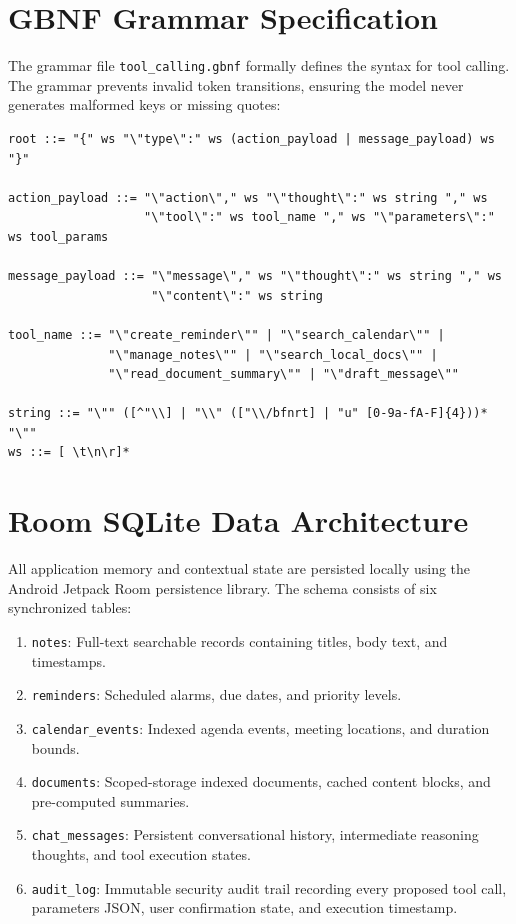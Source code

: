 \documentclass[12pt,a4paper,oneside]{report}
\begin{document}
\section{GBNF Grammar Specification}
The grammar file \texttt{tool\_calling.gbnf} formally defines the syntax for tool calling. The grammar prevents invalid token transitions, ensuring the model never generates malformed keys or missing quotes:
\begin{lstlisting}
root ::= "{" ws "\"type\":" ws (action_payload | message_payload) ws "}"

action_payload ::= "\"action\"," ws "\"thought\":" ws string "," ws 
                   "\"tool\":" ws tool_name "," ws "\"parameters\":" ws tool_params

message_payload ::= "\"message\"," ws "\"thought\":" ws string "," ws 
                    "\"content\":" ws string

tool_name ::= "\"create_reminder\"" | "\"search_calendar\"" | 
              "\"manage_notes\"" | "\"search_local_docs\"" | 
              "\"read_document_summary\"" | "\"draft_message\""

string ::= "\"" ([^"\\] | "\\" (["\\/bfnrt] | "u" [0-9a-fA-F]{4}))* "\""
ws ::= [ \t\n\r]*
\end{lstlisting}

\section{Room SQLite Data Architecture}
All application memory and contextual state are persisted locally using the Android Jetpack Room persistence library. The schema consists of six synchronized tables:
\begin{enumerate}
    \item \texttt{notes}: Full-text searchable records containing titles, body text, and timestamps.
    \item \texttt{reminders}: Scheduled alarms, due dates, and priority levels.
    \item \texttt{calendar\_events}: Indexed agenda events, meeting locations, and duration bounds.
    \item \texttt{documents}: Scoped-storage indexed documents, cached content blocks, and pre-computed summaries.
    \item \texttt{chat\_messages}: Persistent conversational history, intermediate reasoning thoughts, and tool execution states.
    \item \texttt{audit\_log}: Immutable security audit trail recording every proposed tool call, parameters JSON, user confirmation state, and execution timestamp.
\end{enumerate}
\end{document}

